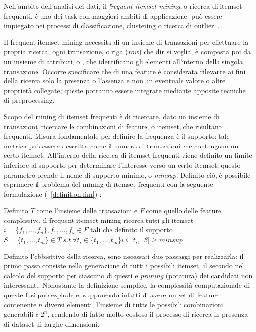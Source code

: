 Nell'ambito dell'analisi dei dati, il \textit{frequent itemset mining}, o ricerca di itemset frequenti,
è uno dei task con maggiori ambiti di applicazione: può essere impiegato nei processi di classificazione,
clustering o ricerca di outlier~\cite{article}.

Il frequent itemset mining necessita di un insieme di transazioni per effettuare la propria ricerca,
ogni transazione, o riga (\textit{row}) che dir si voglia, è composta poi da un insieme di attributi,
o , che identificano gli elementi all'interno della singola transazione.
Occorre specificare che di una feature è considerata rilevante ai fini della ricerca solo la presenza
o l'assenza e non un eventuale valore o altre proprietà collegate; queste potranno essere integrate
mediante apposite tecniche di preprocessing.

Scopo del mining di itemset frequenti è di ricercare, dato un insieme di transazioni, ricercare
le combinazioni di feature, o itemset, che risultano frequenti.
Misura fondamentale per definire la frequenza è il supporto: tale metrica può essere
descritta come il numero di transazioni che contengono un certo itemset.
All'interno della ricerca di itemset frequenti viene definito un limite inferiore al supporto
per determinare l'interesse verso un certo itemset; questo parametro prende il nome
di supporto minimo, o \textit{minsup}.
Definito ciò, è possibile esprimere il problema del mining di itemset frequenti con
la seguente formulazione (~\cref{definition:fim}) :

\begin{definition}\label{definition:fim}
  Definito \(T\) come l'insieme delle transazioni e \(F\) come quello delle feature complessive,
  il frequent itemset mining ricerca tutti gli itemset \\
  \( i = \{ f_{1}, \ldots, f_{n}\}, f_{1}, \ldots, f_{n} \in F\)
  tali che definito il supporto \( S = \{ t_{1}, \ldots, t_{m} \} \in T \; s.t \; \forall t_{i} \in \{ t_{1}, \ldots, t_{m} \}
  i \subseteq t_{i}  \), \(|S| \geq minsup\)
\end{definition}

Definito l'obbiettivo della ricerca, sono necessari due passaggi per realizzarla:
il primo passo consiste nella generazione di tutti i possibili itemset, il secondo
nel calcolo del supporto per ciascuno di questi e \textit{pruning} (potatura) dei candidati
non interessanti.
Nonostante la definizione semplice, la complessità computazionale di queste fasi può esplodere:
supponendo infatti di avere un set di feature contenente \(n\) diversi elementi, l'insieme di tutte
le possibili combinazioni generabili è \(2^n\), rendendo di fatto molto costoso il processo
di ricerca in presenza di dataset di larghe dimensioni.

